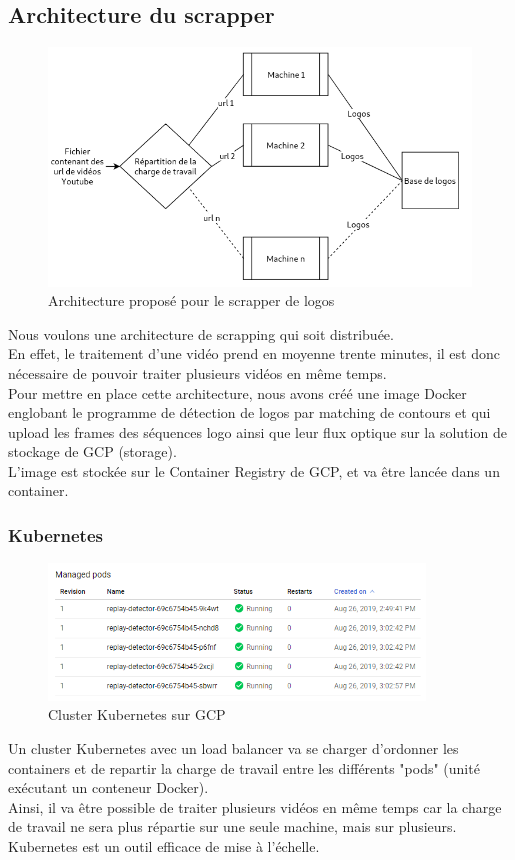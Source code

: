 \documentclass[11pt]{article}
\begin{document}
\subsection{Architecture du scrapper}
\label{sec:orgdb250f3}
\begin{figure}[htbp]
\centering
\includegraphics[width=15cm]{arch_scrap.png}
\caption{Architecture proposé pour le scrapper de logos}
\end{figure}
Nous voulons une architecture de scrapping qui soit distribuée.\\
En effet, le traitement d'une vidéo prend en moyenne trente minutes, il est donc nécessaire de pouvoir traiter plusieurs vidéos en même temps.\\
Pour mettre en place cette architecture, nous avons créé une image Docker englobant le programme de détection de logos par matching de contours et qui upload les frames des séquences logo ainsi que leur flux optique sur la solution de stockage de GCP (storage).\\
L'image est stockée sur le Container Registry de GCP, et va être lancée dans un container.\\

\subsubsection{Kubernetes}
\label{sec:orgfbe5790}
\begin{figure}[htbp]
\centering
\includegraphics[width=10cm]{kubernetes_pods.png}
\caption{Cluster Kubernetes sur GCP}
\end{figure}
Un cluster Kubernetes avec un load balancer va se charger d'ordonner les containers et de repartir la charge de travail entre les différents "pods" (unité exécutant un conteneur Docker).\\
Ainsi, il va être possible de traiter plusieurs vidéos en même temps car la charge de travail ne sera plus répartie sur une seule machine, mais sur plusieurs. Kubernetes est un outil efficace de mise à l'échelle.\\
\end{document}
